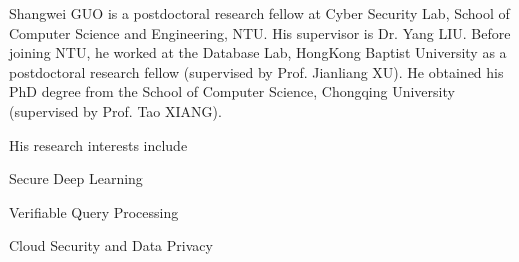 


\begin{cvparagraph}
	
	Shangwei GUO is a postdoctoral research fellow at Cyber Security Lab, School of Computer Science and Engineering, NTU. His supervisor is Dr. Yang LIU. Before joining NTU, he worked at the Database Lab, HongKong Baptist University as a postdoctoral research fellow (supervised by Prof. Jianliang XU). He obtained his PhD degree from the School of Computer Science, Chongqing University (supervised by Prof. Tao XIANG). 
	
	\indent His research interests include
	\vspace{0.2cm}
	{
		\begin{cvitems}
			\item{Secure Deep Learning}
			\item{Verifiable Query Processing}
			\item{Cloud Security and Data Privacy}
		\end{cvitems}
	}
\end{cvparagraph}
\vspace{-0.2cm}